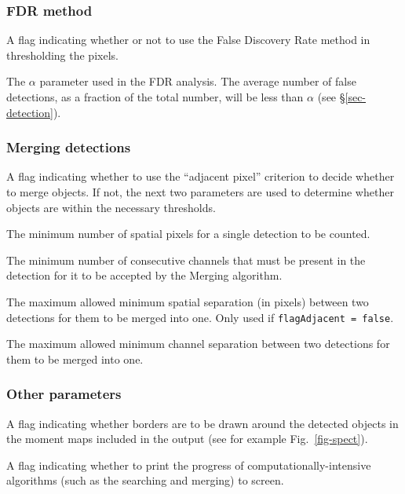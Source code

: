 \documentclass[12pt,a4paper]{article}
\newcommand{\entrylabel}[1]{\mbox{\textsf{\bf{#1:}}}\hfil}
\newenvironment{entry}
        {\begin{list}{}%
                {\renewcommand{\makelabel}{\entrylabel}%
                        \setlength{\labelwidth}{30mm}%
                        \setlength{\labelsep}{5pt}%
                        \setlength{\itemsep}{2pt}%
                        \setlength{\parsep}{2pt}%
                        \setlength{\leftmargin}{35mm}%
                }%
        }%
{\end{list}}
\begin{document}
\subsubsection*{FDR method}
\begin{entry}
\item[flagFDR {\tt [false]}] A flag indicating whether or not to use
  the False Discovery Rate method in thresholding the pixels.
\item[alphaFDR {\tt [0.01]}] The $\alpha$ parameter used in the FDR
analysis. The average number of false detections, as a fraction of the
total number, will be less than $\alpha$ (see \S\ref{sec-detection}).
\end{entry}

\subsubsection*{Merging detections}
\begin{entry}
\item[flagAdjacent {\tt [true]}] A flag indicating whether to use the
  ``adjacent pixel'' criterion to decide whether to merge objects. If
  not, the next two parameters are used to determine whether objects
  are within the necessary thresholds.
\item[minPix {\tt [2]}] The minimum number of spatial pixels for a single
  detection to be counted.
\item[minChannels {\tt [3]}] The minimum number of consecutive
  channels that must be present in the detection for it to be accepted
  by the Merging algorithm.
\item[threshSpatial {\tt [3.]}] The maximum allowed minimum spatial
  separation (in pixels) between two detections for them to be merged
  into one. Only used if {\tt flagAdjacent = false}.
\item[threshVelocity {\tt [7.]}] The maximum allowed minimum channel
  separation between two detections for them to be merged into
  one. %
\end{entry}

\subsubsection*{Other parameters}
\begin{entry}
\item[drawBorders {\tt [true]}] A flag indicating whether borders
  are to be drawn around the detected objects in the moment maps
  included in the output (see for example Fig.~\ref{fig-spect}).
\item[verbose {\tt [true]}] A flag indicating whether to print the
  progress of computationally-intensive algorithms (such as the
  searching and merging) to screen.
\end{entry}
\end{document}
